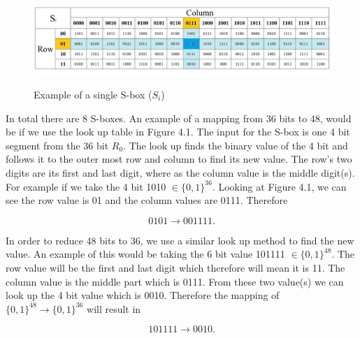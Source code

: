 \documentclass[11pt,a4paper, notitlepage]{report}
\begin{document}
\newpage
\begin{landscape}
\begin{figure}[H]
\begin{center}
\label{Fig:S-boxes}
\includegraphics[scale = 0.6]{S-boxes.png}
\caption{Example of a single S-box ($S_{i}$)}
\end{center}
\end{figure}
\end{landscape}

\newpage

In total there are 8 S-boxes. An example of a mapping from 36 bits to 48, would be if we use the look up table in Figure 4.1. The input for the S-box is one 4 bit segment from the 36 bit $R_{0}$. The look up finds the binary value of the 4 bit and follows it to the outer most row and column to find its new value. The row's two digits are its first and last digit, where as the column value is the middle digit(s). For example if we take the 4 bit 1010 $\in \{0,1 \}^{36}$. Looking at Figure 4.1, we can see the row value is 01 and the column values are 0111. Therefore 

\begin{displaymath}
0101 \rightarrow 001111.
\end{displaymath}

In order to reduce 48 bits to 36, we use a similar look up method to find the new value. An example of this would be taking the 6 bit value 101111 $\in \{0,1 \}^{48}$. The row value will be the first and last digit which therefore will mean it is 11. The column value is the middle part which is 0111. From these two value(s) we can look up the 4 bit value which is 0010. Therefore the mapping of $\{0, 1\}^{48} \rightarrow \{0, 1\}^{36}$ will result in

\begin{displaymath}
101111 \rightarrow 0010.
\end{displaymath}
\end{document}
